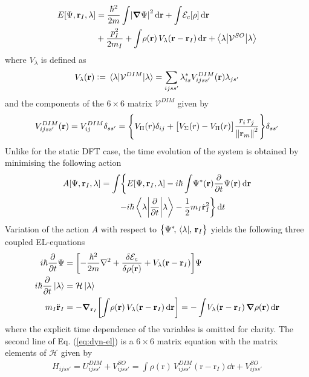 \documentclass[12pt,a4paper,twosides]{book}
\renewcommand{\vec}[1]{\bm{\mathrm{#1}}}
\newcommand{\diff}[1]{\,\mathrm{d}{\vec{#1}}}
\begin{document}
			\begin{align}
				E[\Psi, \vec{r}_I, \lambda] &= \frac{\hbar^2}{2m}\int\!\abs{\grad \Psi}^2\diff{r}
				+ \int\!{\cal E}_c[\rho]\diff{r} \nonumber \\
				&+ \frac{p^2_I}{2 m_I}
				+ \int\!\rho(\vec{r})\,V_\lambda(\vec{r}-\vec{r}_I)\diff{r}
				+ \ev**{\mathcal{V}^{SO}}{\lambda}
			\end{align}
			where $V_\lambda$ is defined as
			\begin{align}
				V_\lambda(\vec{r}) \vcentcolon= \ev{\mathcal{V}^{DIM}}{\lambda} = \sum_{ijss'}\lambda^*_{is}V^{DIM}_{ijss'}(\vec{r})\lambda_{js'} 
			\end{align}
			and the components of the $6\times6$ matrix ${\mathcal V}^{DIM}$ given by
			\begin{equation}
				V^{DIM}_{ijss'}(\vec{r})=V^{DIM}_{ij}\delta_{ss'}=\qty{V_\Pi(r)\delta_{ij}+\qty\big[V_\Sigma(r)-V_\Pi(r)]\frac{r_i\,r_j}{\norm{\vec{r}_m}^2}}\delta_{ss'}
			\end{equation}
			Unlike for the static DFT case, the time evolution of the system is obtained by minimising the following action
			\begin{align}
				A[\Psi,\vec{r}_I,\lambda] = \int\!\bigg\{&E[\Psi,\vec{r}_I,\lambda] -i\hbar\int \!\Psi^*(\vec{r}) \pdv{t}\Psi(\vec{r})\dd{\vec{r}} \nonumber \\
				-&i\hbar\ev**{\pdv{t}}{\lambda} - \frac{1}{2} m_I \dot{\vec{r}}^2_I\bigg\}\dd{t}
			\end{align}
			Variation of the action $A$ with respect to $\qty\big{\Psi^*\!,\,\bra\lambda\!,\,\vec{r}_I}$ yields the following three coupled EL-equations
			\begin{align}
				i\hbar\pdv{t}\Psi &= \qty[-\frac{\hbar^2}{2m}\laplacian +\fdv{\mathcal{E}_c}{\rho(\mathbf{r})} + V_\lambda(\vec{r}-\vec{r}_I)]\Psi \nonumber \\
				i\hbar\pdv{t}\ket\lambda  &= \mathcal{H}\ket\lambda \nonumber \\
				m_I\ddot{\vec{r}}_I &= - \grad_{\vec{r}_I}\qty[\int\!\rho(\vec{r})\,V_\lambda(\vec{r}-\vec{r}_I)\dd{\vec{r}}] = -\int\!V_\lambda(\vec{r}-\vec{r}_I)\,\grad\rho(\vec{r})\dd{\vec{r}} \label{eq:dyn-el}
			\end{align}
			where the explicit time dependence of the variables is omitted for clarity. The second line of Eq. (\ref{eq:dyn-el}) is a $6\times 6$ matrix equation with the matrix elements of $\mathcal{H}$ given by
			\begin{align}
				H_{ijss'} = U^{DIM}_{ijss'}+V^{SO}_{ijss'} = \int\!\rho(\vec{r})\,V^{DIM}_{ijss'}(\vec{r}-\vec{r}_I)\dd{\vec{r}}+V^{SO}_{ijss'}
			\end{align}
\end{document}
